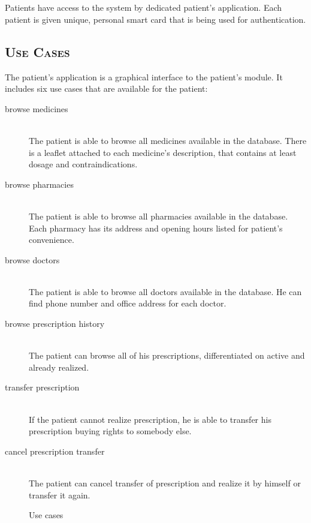 
\chapter {}

Patients have access to the system by dedicated patient's application. 
Each patient is given unique, personal smart card that is being used for authentication.


\section{\textsc{Use Cases}}

The patient's application is a graphical interface to the patient's module. 
It includes six use cases that are available for the patient:
\begin{description}
\item[browse medicines] \hfill \\
The patient is able to browse all medicines available in the database. 
There is a leaflet attached to each medicine's description, that contains at least dosage and contraindications.
\item[browse pharmacies] \hfill \\
The patient is able to browse all pharmacies available in the database. 
Each pharmacy has its address and opening hours listed for patient's convenience.
\item[browse doctors] \hfill \\
The patient is able to browse all doctors available in the database. 
He can find phone number and office address for each doctor.
\item[browse prescription history] \hfill \\
The patient can browse all of his prescriptions, differentiated on active and already realized.
\item[transfer prescription] \hfill \\
If the patient cannot realize prescription, he is able to transfer his prescription buying rights to somebody else.
\item[cancel prescription transfer] \hfill \\
The patient can cancel transfer of prescription and realize it by himself or transfer it again.
\end{description}

\begin{figure}[h]
\caption{Use cases}
\end{figure}

